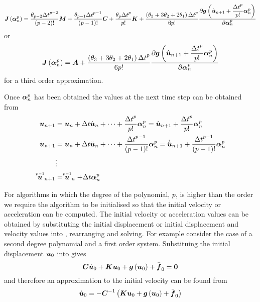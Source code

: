 \begin{equation}
  \fnof{\matr{J}}{\vectr{\alpha}^{p}_{n}}=\dfrac{\theta_{p-2}{\Delta
      t}^{p-2}}{\factorial{p-2}}\matr{M}+ \dfrac{\theta_{p-1}{\Delta
      t}^{p-1}}{\factorial{p-1}}\matr{C}+\dfrac{\theta_{p}{\Delta
      t}^{p}}{p!}\matr{K}+
  \dfrac{\pbrac{\theta_{3}+3\theta_{2}+2\theta_{1}}{\Delta t}^{p}}{6p!}
  \delby{\fnof{\vectr{g}}{\hat{\vectr{u}}_{n+1}+\dfrac{{\Delta t}^{p}}{p!}
      \vectr{\alpha}^{p}_{n}}}{\vectr{\alpha}^{p}_{n}}
\end{equation}
or
\begin{equation}
  \fnof{\matr{J}}{\vectr{\alpha}^{p}_{n}}=\matr{A}+\dfrac{\pbrac{\theta_{3}+3\theta_{2}+2\theta_{1}}{\Delta
      t}^{p}}{6p!}
  \delby{\fnof{\vectr{g}}{\hat{\vectr{u}}_{n+1}+\dfrac{{\Delta
          t}^{p}}{p!}\vectr{\alpha}^{p}_{n}}}{\vectr{\alpha}^{p}_{n}}
\end{equation}
for a third order approximation.

Once $\boldsymbol{\alpha}^{p}_{n}$ has been obtained the values at the next time step can be obtained from
\begin{equation}
  \begin{split}
    \boldsymbol{u}_{n+1} &= \boldsymbol{u}_{n}+\Delta t
    \dot{\boldsymbol{u}}_{n}+\cdots+\dfrac{{\Delta
        t}^{p}}{p!}\boldsymbol{\alpha}^{p}_{n}=\hat{\boldsymbol{u}}_{n+1}+
    \dfrac{{\Delta t}^{p}}{p!}\boldsymbol{\alpha}^{p}_{n}\\
    \dot{\boldsymbol{u}}_{n+1} &= \dot{\boldsymbol{u}}_{n}+\Delta t
    \ddot{\boldsymbol{u}}_{n}+\cdots+\dfrac{{\Delta
        t}^{p-1}}{\left( p-1 \right)!}\boldsymbol{\alpha}^{p}_{n}=\dot{\hat{\boldsymbol{u}}}_{n+1}+\dfrac{{\Delta
        t}^{p-1}}{\left( p-1 \right)!}\boldsymbol{\alpha}^{p}_{n} \\
    &\vdots \\
     \stackrel{\scriptscriptstyle p-1}{\boldsymbol{u}} _{n+1} &=  \stackrel{\scriptscriptstyle p-1}{\boldsymbol{u}} _{n}+\Delta t\boldsymbol{\alpha}^{p}_{n}
  \end{split}
\end{equation}

For algorithms in which the degree of the polynomial, $p$, is higher than the
order we require the algorithm to be initialised so that the initial velocity
or acceleration can be computed. The initial velocity or acceleration values
can be obtained by substituting the initial displacement or initial
displacement and velocity values into ,
rearranging and solving. For example consider the case of a second degree
polynomial and a first order system. Substituing the initial displacement
$\boldsymbol{u}_{0}$ into  gives
\begin{equation}
  \matr{C}\dot{\vectr{u}}_{0}+\matr{K}\vectr{u}_{0}+\fnof{\vectr{g}}{\vectr{u}_{0}}+\bar{\vectr{f}}_{0}=\vectr{0}
\end{equation}
and therefore an approximation to the initial velocity can be found from
\begin{equation}
  \dot{\vectr{u}}_{0}=-\inverse{\matr{C}}\pbrac{\matr{K}\vectr{u}_{0}+\fnof{\vectr{g}}{\vectr{u}_{0}}+\bar{\vectr{f}}_{0}}
\end{equation}

